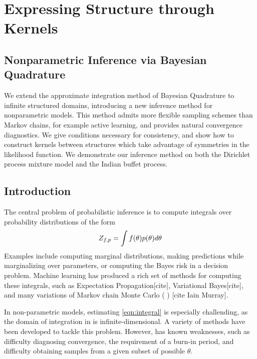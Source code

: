 
\inbpdocument

\newcommand{\infinitefiguresdir}{infinite-figures}


\chapter{Expressing Structure through Kernels}
\label{ch:kernels}

\section{Nonparametric Inference via Bayesian Quadrature}

We extend the approximate integration method of Bayesian Quadrature to infinite structured domains, introducing a new inference method for nonparametric models.%
This method admits more flexible sampling schemes than Markov chains, for example active learning, and provides natural convergence diagnostics.  We give conditions necessary for consistency, and show how to construct kernels between structures which take advantage of symmetries in the likelihood function.  We demonstrate our inference method on both the Dirichlet process mixture model and the Indian buffet process.



\section{Introduction}

The central problem of probabilistic inference is to compute integrals over probability distributions of the form
\begin{equation}
	Z_{f,p} = \int f(\theta) p(\theta) d\theta
	\label{eqn:integral}
\end{equation}
Examples include computing marginal distributions, making predictions while marginalizing over parameters, or computing the Bayes risk in a decision problem.  Machine learning has produced a rich set of methods for computing these integrals, such as Expectation Propagation[cite], Variational Bayes[cite], and many variations of Markov chain Monte Carlo (\mcmc{} ) [cite Iain Murray].  

In non-parametric models, estimating \eqref{eqn:integral} is especially challending, as the domain of integration in is infinite-dimensional.  A variety of \mcmc{} methods have been developed to tackle this problem.  However, \mcmc{} has known weaknesses, such as difficulty diagnosing convergence, the requirement of a burn-in period, and difficulty obtaining samples from a given subset of possible $\theta$.

